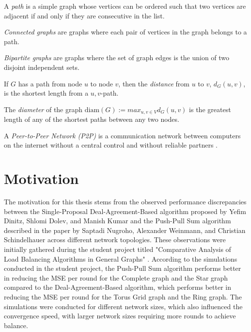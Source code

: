 \begin{definition}[Path]
    A \textit{path} is a simple graph whose vertices can be ordered such that two vertices are adjacent if and only if they are consecutive in the list.
\end{definition}

\begin{definition}
    \textit{Connected graphs} are graphs where each pair of vertices in the graph belongs to a path.
\end{definition}

\begin{definition}
    \textit{Bipartite graphs} are graphs where the set of graph edges is the union of two disjoint independent sets.
\end{definition}

\begin{definition}
    If $G$ has a path from node $u$ to node $v$, then the \textit{distance} from $u$ to $v$, $d_G(u,v)$, is the shortest length from a $u,v$-path.
    
    The \textit{diameter} of the graph $\text{diam} (G) := max_{u,v\in V}d_G(u,v)$ is the greatest length of any of the shortest paths between any two nodes.
\end{definition}

\begin{definition}
    A \textit{Peer-to-Peer Network (P2P)} is a communication network between computers on the internet without a central control and without reliable partners \cite{Peer2PeerSchindelhaauer2023}.
\end{definition}

\section{Motivation}\label{sec:motivation}
The motivation for this thesis stems from the observed performance discrepancies between the Single-Proposal Deal-Agreement-Based algorithm proposed by Yefim Dinitz, Shlomi Dolev, and Manish Kumar \cite{Dinitz2023DAB} and the Push-Pull Sum algorithm described in the paper by Saptadi Nugroho, Alexander Weinmann, and Christian Schindelhauer \cite{nugroho2023PushPullSumDataAg} across different network topologies. These observations were initially gathered during the student project titled "Comparative Analysis of Load Balancing Algorithms in General Graphs" \cite{Bayazitoglu}. According to the simulations conducted in the student project, the Push-Pull Sum algorithm performs better in reducing the MSE per round for the Complete graph and the Star graph compared to the Deal-Agreement-Based algorithm, which performs better in reducing the MSE per round for the Torus Grid graph and the Ring graph. The simulations were conducted for different network sizes, which also influenced the convergence speed, with larger network sizes requiring more rounds to achieve balance.

